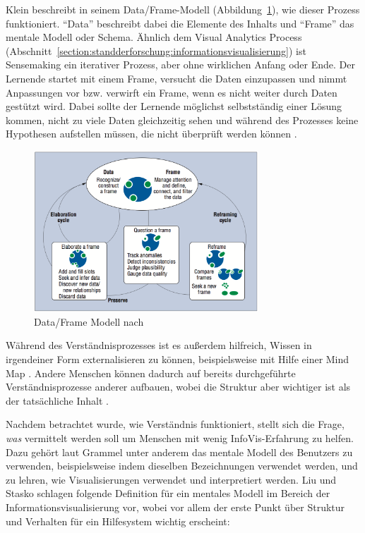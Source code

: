 \documentclass[
	headsepline,
	footsepline,
	fontsize=12pt,
	bibliography=totoc
]{scrbook}
\begin{document}

Klein \cite{Klein2006a} beschreibt in seinem Data/Frame-Modell (Abbildung~\ref{figure:data_frame_model}), wie dieser Prozess funktioniert. \enquote{Data} beschreibt dabei die Elemente des Inhalts und \enquote{Frame} das mentale Modell oder Schema. Ähnlich dem Visual Analytics Process (Abschnitt~\ref{section:standderforschung:informationsvisualisierung}) ist Sensemaking ein iterativer Prozess, aber ohne wirklichen Anfang oder Ende. Der Lernende startet mit einem Frame, versucht die Daten einzupassen und nimmt Anpassungen vor bzw. verwirft ein Frame, wenn es nicht weiter durch Daten gestützt wird. Dabei sollte der Lernende möglichst selbstständig einer Lösung kommen, nicht zu viele Daten gleichzeitig sehen und während des Prozesses keine Hypothesen aufstellen müssen, die nicht überprüft werden können \cite{Klein2006}.

\begin{figure}[htbp]
   \centering
   \includegraphics[width=0.75\textwidth]{images/grundlagen-data_frame_model.png}
   \caption{Data/Frame Modell nach \cite{Klein2006}}
   \label{figure:data_frame_model}
\end{figure}


Während des Verständnisprozesses ist es außerdem hilfreich, Wissen in irgendeiner Form externalisieren zu können, beispielsweise mit Hilfe einer Mind Map \cite{Qu2005, Novak2007, Umapathy2010}. Andere Menschen können dadurch auf bereits durchgeführte Verständnisprozesse anderer aufbauen, wobei die Struktur aber wichtiger ist als der tatsächliche Inhalt \cite{Fisher2012}.

Nachdem betrachtet wurde, wie Verständnis funktioniert, stellt sich die Frage, \emph{was} vermittelt werden soll um Menschen mit wenig InfoVis-Erfahrung zu helfen. Dazu gehört laut Grammel \cite[S. 127]{Grammel2012} unter anderem das mentale Modell des Benutzers zu verwenden, beispielsweise indem dieselben Bezeichnungen verwendet werden, und zu lehren, wie Visualisierungen verwendet und interpretiert werden.  Liu und Stasko \cite{Liu2010} schlagen folgende Definition für ein mentales Modell im Bereich der Informationsvisualisierung vor, wobei vor allem der erste Punkt über Struktur und Verhalten für ein Hilfesystem wichtig erscheint:
\end{document}
